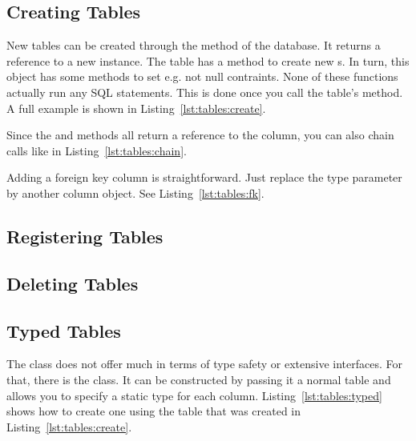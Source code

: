 
\subsection{Creating Tables}
\label{section:tables:create}

New tables can be created through the  method of the database. It returns a reference to a new  instance. The table has a method to create new s. In turn, this object has some methods to set e.g. not null contraints. None of these functions actually run any SQL statements. This is done once you call the table's  method.  A full example is shown in Listing~\ref{lst:tables:create}.



Since the  and  methods all return a reference to the column, you can also chain calls like in Listing~\ref{lst:tables:chain}.



Adding a foreign key column is straightforward. Just replace the type parameter by another column object. See Listing~\ref{lst:tables:fk}.



\subsection{Registering Tables}
\label{section:tables:register}

\subsection{Deleting Tables}
\label{section:tables:delete}

\subsection{Typed Tables}
\label{section:tables:typed}

The  class does not offer much in terms of type safety or extensive interfaces. For that, there is the  class. It can be constructed by passing it a normal table and allows you to specify a static type for each column. Listing~\ref{lst:tables:typed} shows how to create one using the table that was created in Listing~\ref{lst:tables:create}.

